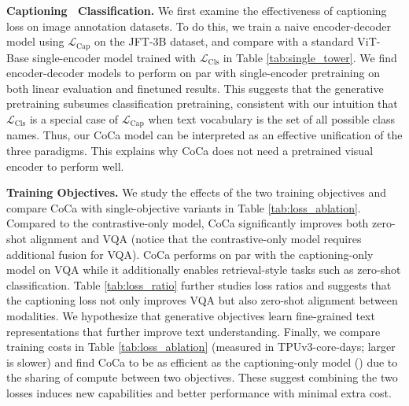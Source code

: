 \textbf{Captioning \vs \ Classification.}
We first examine the effectiveness of captioning loss on image annotation datasets.
To do this,
we train a naive encoder-decoder model using $\mathcal{L}_{\text{Cap}}$ on the JFT-3B dataset,
and compare with a standard ViT-Base single-encoder model trained with $\mathcal{L}_{\text{Cls}}$ in Table \ref{tab:single_tower}.
We find encoder-decoder models to perform on par with single-encoder pretraining on both linear evaluation and finetuned results.
This suggests that the generative pretraining subsumes classification pretraining,
consistent with our intuition that $\mathcal{L}_{\text{Cls}}$ is a special case of $\mathcal{L}_{\text{Cap}}$ when text vocabulary is the set of all possible class names.
Thus, our CoCa model can be interpreted as an effective unification of the three paradigms.
This explains why CoCa does not need a pretrained visual encoder to perform well.



\textbf{Training Objectives.}
We study the effects of the two training objectives and
compare CoCa with single-objective variants in Table \ref{tab:loss_ablation}.
Compared to the contrastive-only model,
CoCa significantly improves both zero-shot alignment and VQA (notice that the contrastive-only model requires additional fusion for VQA).
CoCa performs on par with the captioning-only model on VQA while it additionally enables retrieval-style tasks such as zero-shot classification.
Table \ref{tab:loss_ratio} further studies loss ratios and suggests that the captioning loss not only improves VQA but also zero-shot alignment between modalities.
We hypothesize that generative objectives learn fine-grained text representations that further improve text understanding.
Finally, we compare training costs in Table \ref{tab:loss_ablation} (measured in TPUv3-core-days; larger is slower) and find CoCa to be as efficient as the captioning-only model () due to the sharing of compute between two objectives.
These suggest combining the two losses induces new capabilities and better performance with minimal extra cost.


